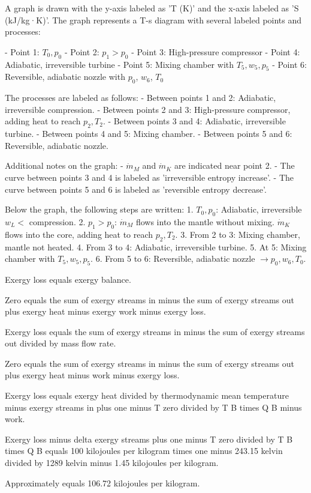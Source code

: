 A graph is drawn with the y-axis labeled as 'T (K)' and the x-axis labeled as 'S (kJ/kg·K)'. The graph represents a T-s diagram with several labeled points and processes:  

- Point 1: \( T_0, p_0 \)  
- Point 2: \( p_1 > p_0 \)  
- Point 3: High-pressure compressor  
- Point 4: Adiabatic, irreversible turbine  
- Point 5: Mixing chamber with \( T_5, w_5, p_5 \)  
- Point 6: Reversible, adiabatic nozzle with \( p_0 \), \( w_6 \), \( T_0 \)  

The processes are labeled as follows:  
- Between points 1 and 2: Adiabatic, irreversible compression.  
- Between points 2 and 3: High-pressure compressor, adding heat to reach \( p_2, T_2 \).  
- Between points 3 and 4: Adiabatic, irreversible turbine.  
- Between points 4 and 5: Mixing chamber.  
- Between points 5 and 6: Reversible, adiabatic nozzle.  

Additional notes on the graph:  
- \( \dot{m}_M \) and \( \dot{m}_K \) are indicated near point 2.  
- The curve between points 3 and 4 is labeled as 'irreversible entropy increase'.  
- The curve between points 5 and 6 is labeled as 'reversible entropy decrease'.  

Below the graph, the following steps are written:  
1. \( T_0, p_0 \): Adiabatic, irreversible \( w_L < \) compression.  
2. \( p_1 > p_0 \): \( \dot{m}_M \) flows into the mantle without mixing. \( \dot{m}_K \) flows into the core, adding heat to reach \( p_2, T_2 \).  
3. From 2 to 3: Mixing chamber, mantle not heated.  
4. From 3 to 4: Adiabatic, irreversible turbine.  
5. At 5: Mixing chamber with \( T_5, w_5, p_5 \).  
6. From 5 to 6: Reversible, adiabatic nozzle \( \rightarrow p_0, w_6, T_0 \).

Exergy loss equals exergy balance.  

Zero equals the sum of exergy streams in minus the sum of exergy streams out plus exergy heat minus exergy work minus exergy loss.  

Exergy loss equals the sum of exergy streams in minus the sum of exergy streams out divided by mass flow rate.  

Zero equals the sum of exergy streams in minus the sum of exergy streams out plus exergy heat minus work minus exergy loss.  

Exergy loss equals exergy heat divided by thermodynamic mean temperature minus exergy streams in plus one minus T zero divided by T B times Q B minus work.  

Exergy loss minus delta exergy streams plus one minus T zero divided by T B times Q B equals 100 kilojoules per kilogram times one minus 243.15 kelvin divided by 1289 kelvin minus 1.45 kilojoules per kilogram.  

Approximately equals 106.72 kilojoules per kilogram.